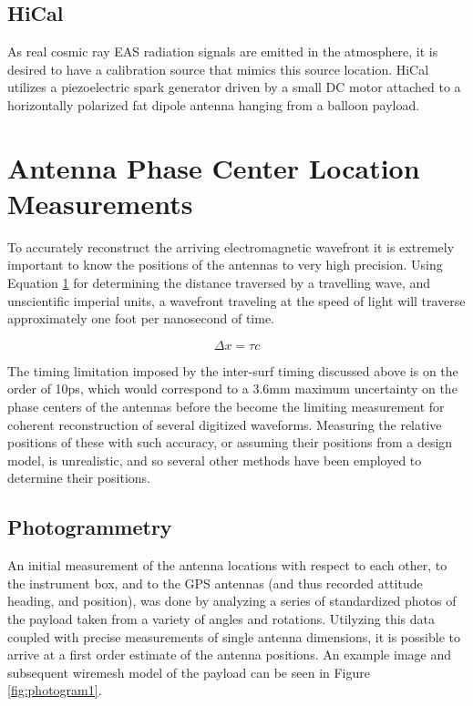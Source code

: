 	\subsection{HiCal}
		As real cosmic ray EAS radiation signals are emitted in the atmosphere, it is desired to have a calibration source that mimics this source location.  HiCal utilizes a piezoelectric spark generator driven by a small DC motor attached to a horizontally polarized fat dipole antenna hanging from a balloon payload.


\section{Antenna Phase Center Location Measurements}
	To accurately reconstruct the arriving electromagnetic wavefront it is extremely important to know the positions of the antennas to very high precision.   Using Equation \ref{eqn:lightTravel} for determining the distance traversed by a travelling wave, and unscientific imperial units, a wavefront traveling at the speed of light will traverse approximately one foot per nanosecond of time. 
	
	\begin{figure}[h]
	\begin{equation}
		\Delta x = \tau c
	\end{equation}
	\label{eqn:lightTravel}
	\end{figure}
	
	The timing limitation imposed by the inter-surf timing discussed above is on the order of 10ps, which would correspond to a 3.6mm maximum uncertainty on the phase centers of the antennas before the become the limiting measurement for coherent reconstruction of several digitized waveforms.  Measuring the relative positions of these with such accuracy, or assuming their positions from a design model, is unrealistic, and so several other methods have been employed to determine their positions.
	
	\subsection{Photogrammetry}
		An initial measurement of the antenna locations with respect to each other, to the instrument box, and to the GPS antennas (and thus recorded attitude heading, and position), was done by analyzing a series of standardized photos of the payload taken from a variety of angles and rotations.  Utilyzing this data coupled with precise measurements of single antenna dimensions, it is possible to arrive at a first order estimate of the antenna positions.  An example image and subsequent wiremesh model of the payload can be seen in Figure \ref{fig:photogram1}.
		
